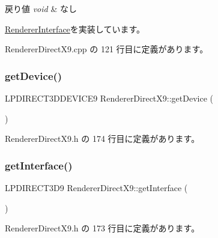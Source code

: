 \begin{DoxyRetVals}{戻り値}
{\em void} & なし \\
\hline
\end{DoxyRetVals}


\mbox{\hyperlink{class_renderer_interface_a0034a44420e4746062e70e4d66d3bee2}{Renderer\+Interface}}を実装しています。



 Renderer\+Direct\+X9.\+cpp の 121 行目に定義があります。

\mbox{\label{class_renderer_direct_x9_a99129e2efa68d4d8b6e5d0dd6b400b70}} 
\subsubsection{\texorpdfstring{get\+Device()}{getDevice()}}
{\footnotesize\ttfamily L\+P\+D\+I\+R\+E\+C\+T3\+D\+D\+E\+V\+I\+C\+E9 Renderer\+Direct\+X9\+::get\+Device (\begin{DoxyParamCaption}{ }\end{DoxyParamCaption})\hspace{0.3cm}{\ttfamily [inline]}}



 Renderer\+Direct\+X9.\+h の 174 行目に定義があります。

\mbox{\label{class_renderer_direct_x9_a9fb0abfa35b22ff87306aff6a641d220}} 
\subsubsection{\texorpdfstring{get\+Interface()}{getInterface()}}
{\footnotesize\ttfamily L\+P\+D\+I\+R\+E\+C\+T3\+D9 Renderer\+Direct\+X9\+::get\+Interface (\begin{DoxyParamCaption}{ }\end{DoxyParamCaption})\hspace{0.3cm}{\ttfamily [inline]}}



 Renderer\+Direct\+X9.\+h の 173 行目に定義があります。

\mbox{\label{class_renderer_direct_x9_af015676b50f3ce1ba7cf20abf6074e3b}} 
